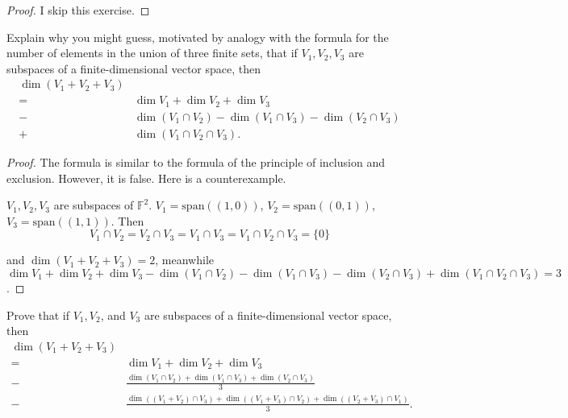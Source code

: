\begin{proof}
    I skip this exercise.
\end{proof}

\begin{exercise}
    Explain why you might guess, motivated by analogy with the formula for the number of elements in the union of three finite sets, that if $V_{1}, V_{2}, V_{3}$ are subspaces of a finite-dimensional vector space, then
    \begin{align*}
        \dim (V_{1} + V_{2} + V_{3}) &                                                                          \\
        =                            & \dim V_{1} + \dim V_{2} + \dim V_{3}                                     \\
        -                            & \dim (V_{1}\cap V_{2}) - \dim (V_{1}\cap V_{3}) - \dim (V_{2}\cap V_{3}) \\
        +                            & \dim (V_{1} \cap V_{2}\cap V_{3}).
    \end{align*}
\end{exercise}

\begin{proof}
    The formula is similar to the formula of the principle of inclusion and exclusion. However, it is false. Here is a counterexample.

    $V_{1}, V_{2}, V_{3}$ are subspaces of $\mathbb{F}^{2}$. $V_{1} = \text{span}((1, 0))$, $V_{2} = \text{span}((0, 1))$, $V_{3} = \text{span}((1, 1))$. Then
    \[
        V_{1}\cap V_{2} = V_{2}\cap V_{3} = V_{1}\cap V_{3} = V_{1}\cap V_{2}\cap V_{3} = \{0\}
    \]

    and $\dim (V_{1} + V_{2} + V_{3}) = 2$, meanwhile $\dim V_{1} + \dim V_{2} + \dim V_{3} - \dim (V_{1}\cap V_{2}) - \dim (V_{1}\cap V_{3}) - \dim (V_{2}\cap V_{3}) + \dim (V_{1}\cap V_{2}\cap V_{3}) = 3$.
\end{proof}

\begin{exercise}
    Prove that if $V_{1}, V_{2}$, and $V_{3}$ are subspaces of a finite-dimensional vector space, then
    \begin{align*}
        \dim (V_{1} + V_{2} + V_{3}) &                                                                                                                    \\
        =                            & \dim V_{1} + \dim V_{2} + \dim V_{3}                                                                               \\
        -                            & \frac{\dim (V_{1}\cap V_{2}) + \dim (V_{1}\cap V_{3}) + \dim (V_{2}\cap V_{3})}{3}                                 \\
        -                            & \frac{\dim ((V_{1} + V_{2})\cap V_{3}) + \dim ((V_{1} + V_{3})\cap V_{2}) + \dim ((V_{2} + V_{3}) \cap V_{1})}{3}.
    \end{align*}
\end{exercise}

